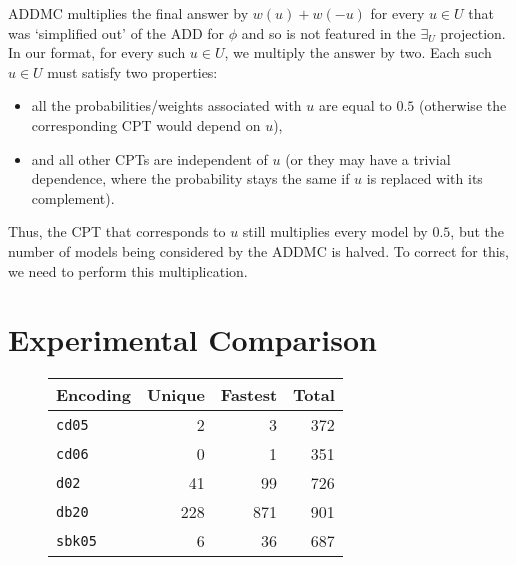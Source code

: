 \documentclass{article}
\theoremstyle{definition}
\theoremstyle{remark}
\begin{document}
{
ADDMC multiplies the final answer by $w(u)+w(-u)$ for every $u \in U$ that was
`simplified out' of the ADD for $\phi$ and so is not featured in the $\exists_U$
projection. In our format, for every such $u \in U$, we multiply the answer by
two. Each such $u \in U$ must satisfy two properties:
\begin{itemize}
\item all the probabilities/weights associated with $u$ are equal to $0.5$
  (otherwise the corresponding CPT would depend on $u$),
\item and all other CPTs are independent of $u$ (or they may have a trivial
  dependence, where the probability stays the same if $u$ is replaced with its
  complement).
\end{itemize}
Thus, the CPT that corresponds to $u$ still multiplies every model by $0.5$, but
the number of models being considered by the ADDMC is halved. To correct for
this, we need to perform this multiplication.

\section{Experimental Comparison} \label{sec:experiments}

\begin{figure}
  \centering
  \begin{minipage}{0.59\textwidth}
    \centering
  \end{minipage}
  \begin{minipage}{0.39\textwidth}
    \centering
    \begin{tabular}{lrrr}
      \toprule
      Encoding & Unique & Fastest & Total \\
      \midrule
      \texttt{cd05} & 2 & 3 & 372 \\
      \texttt{cd06} & 0 & 1 & 351 \\
      \texttt{d02} & 41 & 99 & 726 \\
      \texttt{db20} & 228 & 871 & 901 \\
      \texttt{sbk05} & 6 & 36 & 687 \\
      \bottomrule
    \end{tabular}
  \end{minipage}
\end{figure}

}
\end{document}
